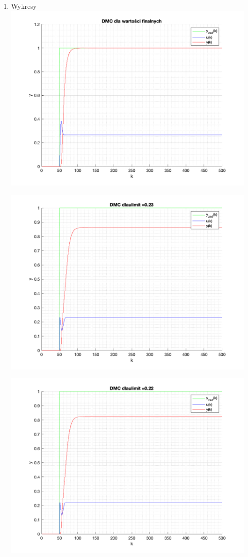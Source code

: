 \documentclass[a4paper, 11pt]{article}
\begin{document}
\begin{enumerate}
\begin{itemize}
  
\end{itemize}
\newpage
\item Wykresy
 \includegraphics[width=\linewidth]{./P6_3_DMC_Koncowe_.png} 
 
 \includegraphics[width=\linewidth]{./ModelsP6_ulimit/P4_DMC_ulimit_0_23_png.png} 
 
 \includegraphics[width=\linewidth]{./ModelsP6_ulimit/P4_DMC_ulimit_0_22_png.png} 
 

\end{enumerate}
\end{document}
